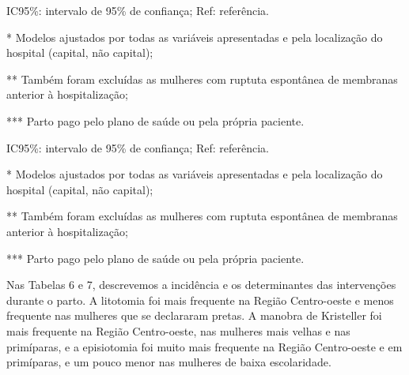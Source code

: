 \documentclass{article}
\begin{document}
IC95\%: intervalo de 95\% de confiança; Ref: referência.

* Modelos ajustados por todas as variáveis apresentadas e pela
localização do hospital (capital, não capital);

** Também foram excluídas as mulheres com ruptuta espontânea de
membranas anterior à hospitalização;

*** Parto pago pelo plano de saúde ou pela própria paciente.

IC95\%: intervalo de 95\% de confiança; Ref: referência.

* Modelos ajustados por todas as variáveis apresentadas e pela
localização do hospital (capital, não capital);

** Também foram excluídas as mulheres com ruptuta espontânea de
membranas anterior à hospitalização;

*** Parto pago pelo plano de saúde ou pela própria paciente.

Nas Tabelas 6 e 7, descrevemos a incidência e os determinantes das intervenções
durante o parto. A litotomia foi mais frequente na Região Centro-oeste e menos
frequente nas mulheres que se declararam pretas. A manobra de Kristeller foi
mais
frequente na Região Centro-oeste, nas mulheres mais velhas e nas primíparas, e a
episiotomia foi muito mais frequente na Região Centro-oeste e em primíparas, e
um
pouco menor nas mulheres de baixa escolaridade.
\end{document}
